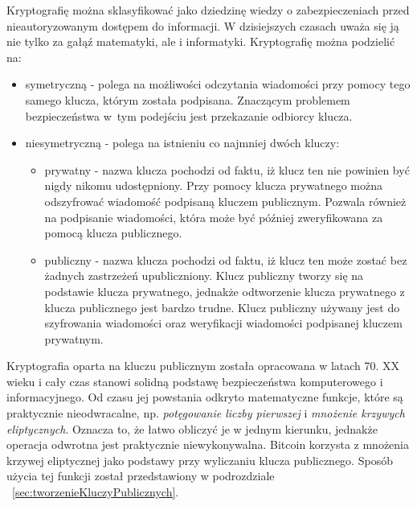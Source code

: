 \documentclass[12pt, twoside, final, openany]{mgr}
\begin{document}
\indent Kryptografię można sklasyfikować jako dziedzinę wiedzy o zabezpieczeniach przed nieautoryzowanym dostępem do informacji. W dzisiejszych czasach uważa się ją nie tylko za gałąź matematyki, ale i informatyki. Kryptografię można podzielić na:
\begin{itemize}
\item symetryczną - polega na możliwości odczytania wiadomości przy pomocy tego samego klucza, którym została podpisana. Znaczącym problemem bezpieczeństwa w~tym podejściu jest przekazanie odbiorcy klucza. 
\item niesymetryczną - polega na istnieniu co najmniej dwóch kluczy:
\begin{itemize}
\item prywatny - nazwa klucza pochodzi od faktu, iż klucz ten nie powinien być nigdy nikomu udostępniony. Przy pomocy klucza prywatnego można odszyfrować wiadomość podpisaną kluczem publicznym. Pozwala również na podpisanie wiadomości, która może być później zweryfikowana za pomocą klucza publicznego.
\item publiczny - nazwa klucza pochodzi od faktu, iż klucz ten może zostać bez żadnych zastrzeżeń upubliczniony. Klucz publiczny tworzy się na podstawie klucza prywatnego, jednakże odtworzenie klucza prywatnego z klucza publicznego jest bardzo trudne. Klucz publiczny używany jest do szyfrowania wiadomości oraz weryfikacji wiadomości podpisanej kluczem prywatnym.
\end{itemize}
\end{itemize} 

\indent Kryptografia oparta na kluczu publicznym została opracowana w latach 70. XX wieku i cały czas stanowi solidną podstawę bezpieczeństwa komputerowego i informacyjnego. Od czasu jej powstania odkryto matematyczne funkcje, które są praktycznie nieodwracalne, np. \textit{potęgowanie liczby pierwszej} i \textit{mnożenie krzywych eliptycznych}. Oznacza to, że łatwo obliczyć je w jednym kierunku, jednakże operacja odwrotna jest praktycznie niewykonywalna. Bitcoin korzysta z mnożenia krzywej eliptycznej jako podstawy przy wyliczaniu klucza publicznego. Sposób użycia tej funkcji został przedstawiony w podrozdziale ~\ref{sec:tworzenieKluczyPublicznych}.
\end{document}
